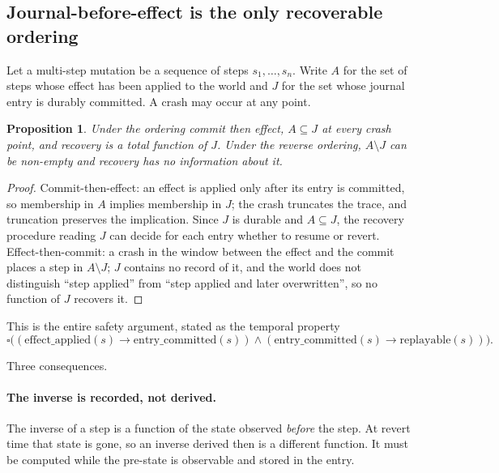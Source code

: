 \documentclass[11pt]{article}
\newtheorem{prop}{Proposition}[section]
\providecommand{\Box}{\square}
\begin{document}
\subsection{Journal-before-effect is the only recoverable ordering}
\label{lbl:HS-MUT-02}

Let a multi-step mutation be a sequence of steps $s_1, \dots, s_n$. Write $A$
for the set of steps whose effect has been applied to the world and $J$ for the
set whose journal entry is durably committed. A crash may occur at any point.

\begin{prop}
Under the ordering \emph{commit then effect}, $A \subseteq J$ at every crash
point, and recovery is a total function of $J$. Under the reverse ordering,
$A \setminus J$ can be non-empty and recovery has no information about it.
\end{prop}

\begin{proof}
Commit-then-effect: an effect is applied only after its entry is committed, so
membership in $A$ implies membership in $J$; the crash truncates the trace, and
truncation preserves the implication. Since $J$ is durable and $A \subseteq J$,
the recovery procedure reading $J$ can decide for each entry whether to resume
or revert. Effect-then-commit: a crash in the window between the effect and the
commit places a step in $A \setminus J$; $J$ contains no record of it, and the
world does not distinguish ``step applied'' from ``step applied and later
overwritten'', so no function of $J$ recovers it.
\end{proof}

This is the entire safety argument, stated as the temporal property
\begin{equation}
\Box\big((\mathrm{effect\_applied}(s) \rightarrow \mathrm{entry\_committed}(s))
\wedge (\mathrm{entry\_committed}(s) \rightarrow \mathrm{replayable}(s))\big).
\end{equation}

Three consequences.

\paragraph{The inverse is recorded, not derived.} The inverse of a step is a
function of the state observed \emph{before} the step. At revert time that
state is gone, so an inverse derived then is a different function. It must be
computed while the pre-state is observable and stored in the entry.
\end{document}
